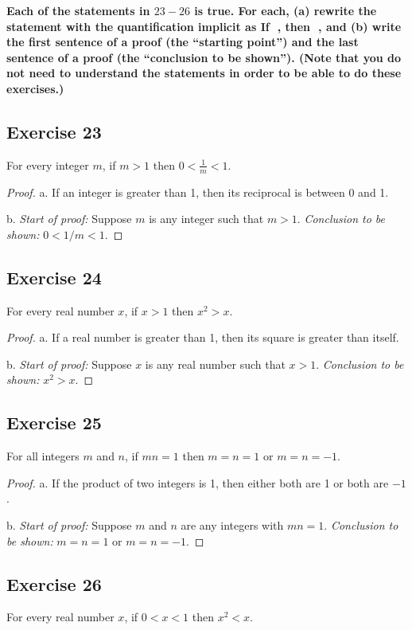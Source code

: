\documentclass[14pt]{extarticle}
\newcommand{\fbl}{\underline{\hspace{1cm}}\,\,}
\newcommand{\cy}{\color{cyan}}
\begin{document}
{\bf \cy Each of the statements in $23-26$ is true. For each, (a) rewrite the statement with the quantification implicit as If \fbl, then \fbl, and (b) write the first sentence of a proof (the “starting point”) and the last sentence of a proof (the “conclusion to be shown”). (Note that you do not need to understand the statements in order to be able to do these exercises.)}

\subsection{Exercise 23}
For every integer $m$, if $m > 1$ then $0 < \frac{1}{m} < 1$.

\begin{proof}
a. If an integer is greater than 1, then its reciprocal is
between 0 and 1.

b. {\it Start of proof:} Suppose $m$ is any integer such that $m > 1$. {\it Conclusion to be shown:} $0 < 1/m < 1$.
\end{proof}

\subsection{Exercise 24}
For every real number $x$, if $x > 1$ then $x^2 > x$.

\begin{proof}
a. If a real number is greater than 1, then its square is greater than itself.

b. {\it Start of proof:} Suppose $x$ is any real number such that $x > 1$. {\it Conclusion to be shown:} $x^2 > x$.
\end{proof}

\subsection{Exercise 25}
For all integers $m$ and $n$, if $mn = 1$ then $m = n = 1$ or $m = n = -1$.

\begin{proof}
a. If the product of two integers is 1, then either both are 1 or both are $-1$.

b. {\it Start of proof:} Suppose $m$ and $n$ are any integers with $mn = 1$. {\it Conclusion to be shown:} $m = n = 1$ or $m = n = -1$.
\end{proof}

\subsection{Exercise 26}
For every real number $x$, if $0 < x < 1$ then $x^2 < x$.
\end{document}
